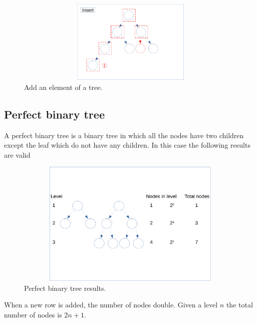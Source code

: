 \begin{figure}[hb]
	\includegraphics[width=12cm,height=4cm]{chapters/trees/images/trees_10.pdf}
	\caption[]{Add an element of a tree.}
	\label{trees_10}
\end{figure}

\subsection{Perfect binary tree}
A perfect binary tree is a binary tree in which all the nodes have two children except the leaf which do not have any children. In this case the following results are valid

\begin{figure}[hb]
	\includegraphics[width=16cm,height=6cm]{chapters/trees/images/trees_11.pdf}
	\caption[]{Perfect binary tree results.}
	\label{trees_11}
\end{figure}

When a new row is added, the number of nodes double. Given a level \(n\) the total number of nodes is \(2n + 1\).